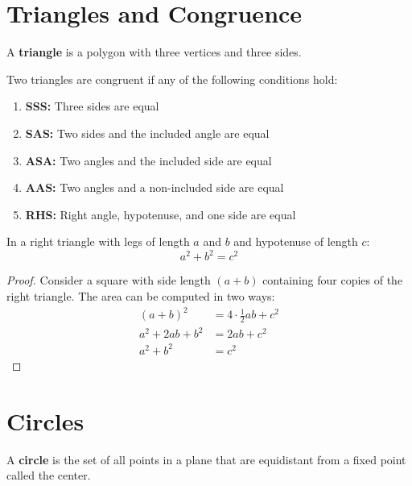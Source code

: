 \section{Triangles and Congruence}

\begin{definition}[Triangle]
A \textbf{triangle} is a polygon with three vertices and three sides.
\end{definition}

\begin{theorem}
Two triangles are congruent if any of the following conditions hold:
\begin{enumerate}
    \item \textbf{SSS:} Three sides are equal
    \item \textbf{SAS:} Two sides and the included angle are equal
    \item \textbf{ASA:} Two angles and the included side are equal
    \item \textbf{AAS:} Two angles and a non-included side are equal
    \item \textbf{RHS:} Right angle, hypotenuse, and one side are equal
\end{enumerate}
\end{theorem}

\begin{theorem}
In a right triangle with legs of length $a$ and $b$ and hypotenuse of length $c$:
\[a^2 + b^2 = c^2\]
\end{theorem}

\begin{proof}
Consider a square with side length $(a+b)$ containing four copies of the right triangle. The area can be computed in two ways:
\begin{align}
(a+b)^2 &= 4 \cdot \frac{1}{2}ab + c^2 \\
a^2 + 2ab + b^2 &= 2ab + c^2 \\
a^2 + b^2 &= c^2
\end{align}
\end{proof}

\section{Circles}

\begin{definition}[Circle]
A \textbf{circle} is the set of all points in a plane that are equidistant from a fixed point called the center.
\end{definition}

